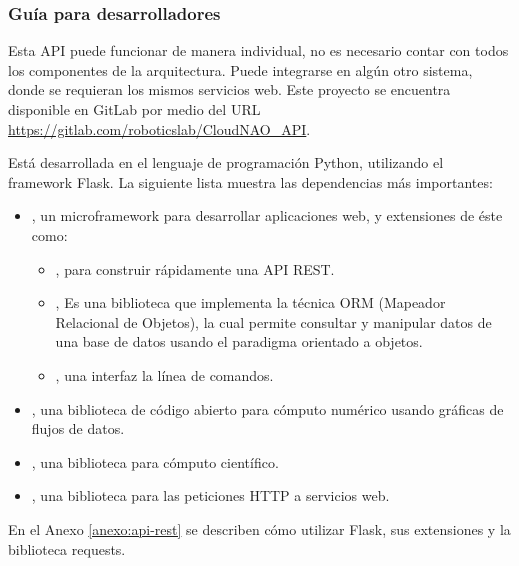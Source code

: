 \subsubsection{Guía para desarrolladores}
\label{\detokenize{chapter_two/desc_cloudnao:documentacion-para-maintainers-de-la-api}}
Esta API puede funcionar de manera individual, no es necesario contar con todos
los componentes de la arquitectura. Puede integrarse en algún otro sistema,
donde se requieran los mismos servicios web. Este proyecto
se encuentra disponible en GitLab
por medio del URL \url{https://gitlab.com/roboticslab/CloudNAO_API}.


Está desarrollada en el lenguaje de programación Python, utilizando el framework
Flask. La siguiente lista muestra las dependencias más importantes:
\begin{itemize}
\item {} 
, un microframework para desarrollar aplicaciones web, y extensiones de éste como:
\begin{itemize}
\item {} 
, para construir rápidamente una API REST.

\item {} 
, Es una biblioteca que implementa la técnica ORM (Mapeador Relacional de Objetos), la cual permite consultar y manipular datos de una base de datos usando el paradigma orientado a objetos.

\item {} 
, una interfaz la línea de comandos.

\end{itemize}

\item {} 
,  una biblioteca de código abierto para cómputo numérico usando gráficas de flujos de datos.

\item {} 
, una biblioteca para cómputo científico.

\item {} 
, una biblioteca para las peticiones HTTP a servicios web.

\end{itemize}

%
En el
Anexo \ref{anexo:api-rest} se describen cómo utilizar
Flask, sus extensiones y la biblioteca requests.


